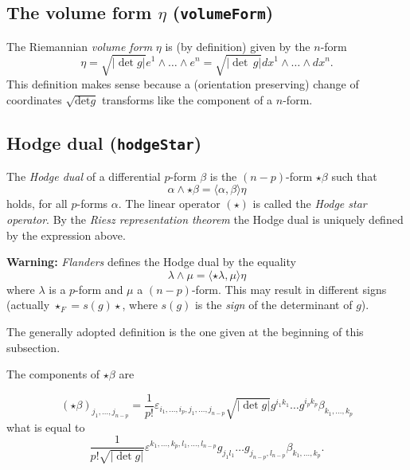 \documentclass[12pt,a4paper]{article}
\begin{document}
\subsection{The volume form $\eta$ ({\tt volumeForm})}
The Riemannian {\it volume form} $\eta$ is (by definition) given by the 
$n$-form 
\begin{displaymath}
	 \eta = \sqrt{| \det g |} e^1 \wedge \ldots \wedge e^n = 
	 \sqrt{| \det\,g |} dx^1 \wedge \ldots \wedge d x^n . \label{vol}
\end{displaymath}
This definition makes sense because a (orientation preserving) change of
coordinates $\sqrt{\mathrm{det} g}$ transforms like the component of
a $n$-form.
%

\subsection{Hodge dual ({\tt hodgeStar})}
The {\it Hodge dual} of a differential $p$-form $\beta$ is the 
$(n - p)$-form $\star \beta$ such that
\begin{displaymath}
	 \alpha \wedge \star \beta = \langle \alpha, \beta \rangle \eta 
	 \label{hodge}
\end{displaymath}
holds, for all $p$-forms $\alpha$. The linear operator $(\star)$ is 
called the {\it Hodge star operator}. By the {\it Riesz representation
theorem} the Hodge dual is uniquely defined by the expression above.
%

\noindent
{\bf Warning:} {\it Flanders} \cite{FLAN} defines the Hodge dual by the 
equality
\begin{displaymath}
	 \lambda \wedge \mu = \langle \star \lambda, \mu \rangle \eta 
\end{displaymath}
where $\lambda$ is a $p$-form and $\mu$ a $(n-p)$-form.
This may result in different signs (actually $\star_F = s(g)\star$,
where $s(g)$ is the {\it sign} of the determinant of $g$).
 
The generally adopted definition is the one given at the beginning 
of this subsection. 

The components of $\star \beta$ are

\begin{displaymath}
	(\star \beta)_{j_1, \ldots, j_{n - p}} = \frac{1}{p!} \varepsilon_{i_1,
   \ldots, i_p, j_1, \ldots, j_{n - p}}  \sqrt{| \det g |} g^{i_1 k_1} \ldots
   g^{i_p k_p} \beta_{k_1, \ldots, k_p} 
\end{displaymath}
what is equal to
\begin{displaymath}
	 \frac{1}{p! \sqrt{| \det g |}} \varepsilon_{}^{k_1, \ldots, k_p, l_1,
   \ldots, l_{n - p}} g_{j_1 l_1} \ldots g_{j_{n - p}, l_{n - p}} \beta_{k_1,
   \ldots, k_p} .
\end{displaymath}
%
\end{document}
